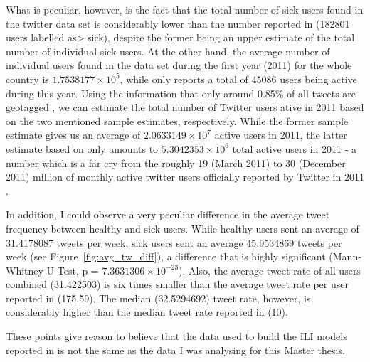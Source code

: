 \documentclass[11pt, a4paper]{report}\usepackage[]{graphicx}\usepackage[]{color}
\begin{document}
What is peculiar, however, is the fact that the total number of sick users found in the twitter data set is considerably lower than the number reported in \citep{bodnar_data_2015} (182801 users labelled as> sick), despite the former being an upper estimate of the total number of individual sick users. At the other hand, the average number of individual users found in the data set during the first year (2011) for the whole country is \ensuremath{1.7538177\times 10^{5}}, while \citep{bodnar_data_2015} only reports a total of 45086 users being active during this year. Using the information that only around 0.85\% of all tweets are geotagged \citep{sloan_who_2015}, we can estimate the total number of Twitter users ative in 2011 based on the two mentioned sample estimates, respectively. While the former sample estimate gives us an average of \ensuremath{2.0633149\times 10^{7}} active users in 2011, the latter estimate based on \cite{bodnar_data_2015} only amounts to \ensuremath{5.3042353\times 10^{6}} total active users in 2011 - a number which is a far cry from the roughly 19 (March 2011) to 30 (December 2011) million of monthly active twitter users officially reported by Twitter in 2011 \citep{twitter_annual_2013}.\newline

In addition, I could observe a very peculiar difference in the average tweet frequency between healthy and sick users. While healthy users sent an average of 31.4178087 tweets per week, sick users sent an average 45.9534869 tweets per week (see Figure~\ref{fig:avg_tw_diff}), a difference that is highly significant (Mann-Whitney U-Test, p = \ensuremath{7.3631306\times 10^{-23}}). Also, the average tweet rate of all users combined (31.422503) is six times smaller than the average tweet rate per user reported in \citep{bodnar_data_2015} (175.59). The median (32.5294692) tweet rate, however, is considerably higher than the median tweet rate reported in \citep{bodnar_data_2015} (10).\newline

These points give reason to believe that the data used to build the ILI models reported in \citep{bodnar_data_2015} is not the same as the data I was analysing for this Master thesis.\newline
\end{document}
